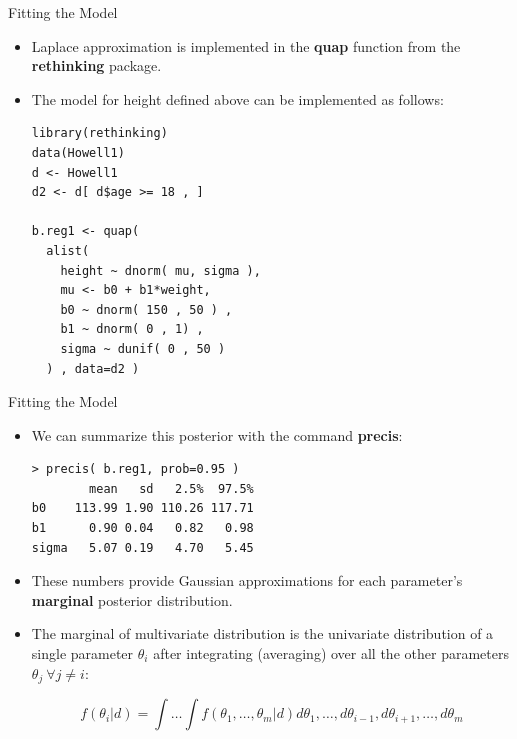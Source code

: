 \documentclass[handout]{beamer}
\begin{document}
\begin{frame}[fragile]{Fitting the Model}
\scriptsize{
\begin{itemize}
 
  \item Laplace approximation is implemented in the \textbf{quap} function from the \textbf{rethinking} package.
  
  \item The model for height defined above can be implemented as follows:
  
  \begin{verbatim}
library(rethinking)
data(Howell1)
d <- Howell1
d2 <- d[ d$age >= 18 , ]

b.reg1 <- quap(
  alist(
    height ~ dnorm( mu, sigma ),
    mu <- b0 + b1*weight,
    b0 ~ dnorm( 150 , 50 ) ,
    b1 ~ dnorm( 0 , 1) ,
    sigma ~ dunif( 0 , 50 )
  ) , data=d2 )
  \end{verbatim}

  

 
\end{itemize}
 

 
}
\end{frame}

\begin{frame}[fragile]{Fitting the Model}
\scriptsize{
\begin{itemize}
 
  \item We can summarize this posterior with the command \textbf{precis}:
  
  \begin{verbatim}
> precis( b.reg1, prob=0.95 )
        mean   sd   2.5%  97.5%
b0    113.99 1.90 110.26 117.71
b1      0.90 0.04   0.82   0.98
sigma   5.07 0.19   4.70   5.45
  \end{verbatim}

\item These numbers provide Gaussian approximations for each parameter's \textbf{marginal} posterior distribution.

\item The marginal of multivariate distribution is the univariate distribution of a single parameter $\theta_i$ after integrating (averaging) over all the other parameters  $\theta_j \ \forall j \neq i$:

\begin{displaymath}
f(\theta_i |d) = \int \dots \int f(\theta_1,\dots,\theta_m|d)d\theta_1,\dots,d\theta_{i-1},d\theta_{i+1},\dots,d\theta_{m} 
\end{displaymath}

 
\end{itemize}
 

 
}
\end{frame}
\end{document}
